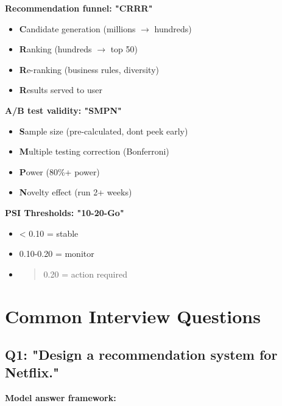 \documentclass[11pt]{article}
\providecommand{\tightlist}{\setlength{\itemsep}{1pt}\setlength{\parskip}{0pt}}
\begin{document}
\textbf{Recommendation funnel: "CRRR"}

\begin{itemize}
\tightlist
\item
  \textbf{C}andidate generation (millions \(\rightarrow\) hundreds)
\item
  \textbf{R}anking (hundreds \(\rightarrow\) top 50)
\item
  \textbf{R}e-ranking (business rules, diversity)
\item
  \textbf{R}esults served to user
\end{itemize}

\textbf{A/B test validity: "SMPN"}

\begin{itemize}
\tightlist
\item
  \textbf{S}ample size (pre-calculated, don\textquotesingle t peek early)
\item
  \textbf{M}ultiple testing correction (Bonferroni)
\item
  \textbf{P}ower (80\%+ power)
\item
  \textbf{N}ovelty effect (run 2+ weeks)
\end{itemize}

\textbf{PSI Thresholds: "10-20-Go"}

\begin{itemize}
\item
  \textless{} 0.10 = stable
\item
  0.10-0.20 = monitor
\item
  \begin{quote}
  0.20 = action required
  \end{quote}
\end{itemize}

\section{Common Interview Questions}\label{common-interview-questions}

\subsection{Q1: "Design a recommendation system for Netflix."}\label{q1-design-a-recommendation-system-for-netflix}

\textbf{Model answer framework:}
\end{document}

